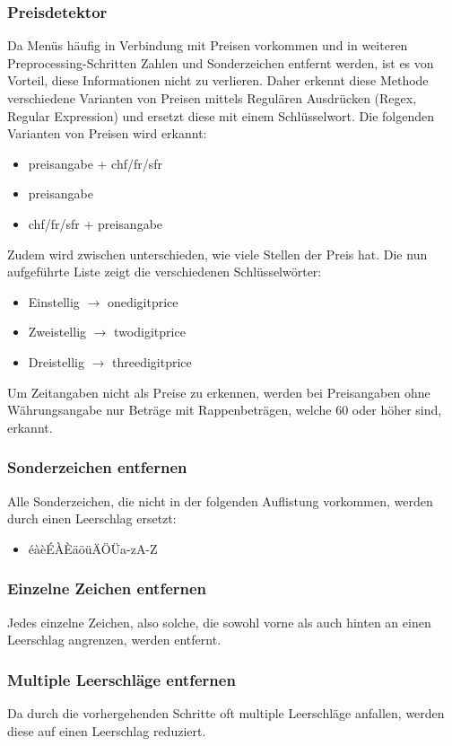 \subsubsection{Preisdetektor}
Da Menüs häufig in Verbindung mit Preisen vorkommen und in weiteren Preprocessing-Schritten Zahlen und Sonderzeichen entfernt werden, ist es von Vorteil, diese Informationen nicht zu verlieren.
Daher erkennt diese Methode verschiedene Varianten von Preisen mittels Regulären Ausdrücken (Regex, Regular Expression) und ersetzt diese mit einem Schlüsselwort.
Die folgenden Varianten von Preisen wird erkannt:
\begin{itemize}
	\item preisangabe + chf/fr/sfr
	\item preisangabe
	\item chf/fr/sfr + preisangabe
\end{itemize} 
Zudem wird zwischen unterschieden, wie viele Stellen der Preis hat.
Die nun aufgeführte Liste zeigt die verschiedenen Schlüsselwörter:
\begin{itemize}
	\item Einstellig $\rightarrow$ onedigitprice
	\item Zweistellig $\rightarrow$ twodigitprice
	\item Dreistellig $\rightarrow$ threedigitprice
\end{itemize} 
Um Zeitangaben nicht als Preise zu erkennen, werden bei Preisangaben ohne Währungsangabe nur Beträge mit Rappenbeträgen, welche 60 oder höher sind, erkannt.
\subsubsection{Sonderzeichen entfernen}
Alle Sonderzeichen, die nicht in der folgenden Auflistung vorkommen, werden durch einen Leerschlag ersetzt:
\begin{itemize}
	\item éàèÉÀÈäöüÄÖÜa-zA-Z
\end{itemize} 
\subsubsection{Einzelne Zeichen entfernen}
Jedes einzelne Zeichen, also solche, die sowohl vorne als auch hinten an einen Leerschlag angrenzen, werden entfernt.
\subsubsection{Multiple Leerschläge entfernen}
Da durch die vorhergehenden Schritte oft multiple Leerschläge anfallen, werden diese auf einen Leerschlag reduziert.
